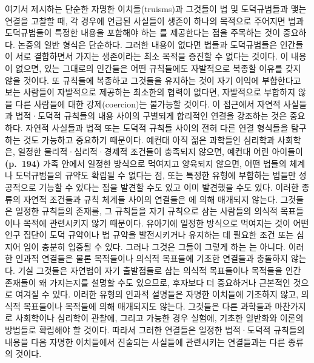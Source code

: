 여기서 제시하는 단순한 자명한 이치들(truisms)과 그것들이 법 및
도덕규범들과 맺는 연결을 고찰할 때, 각 경우에 언급된 사실들이 생존이
하나의 목적으로 주어지면 법과 도덕규범들이 특정한 내용을 포함해야 하는
를 제공한다는 점을 주목하는 것이 중요하다. 논증의
일반 형식은 단순하다. 그러한 내용이 없다면 법들과 도덕규범들은 인간들이
서로 결합하면서 가지는 생존이라는 최소 목적을 증진할 수 없다는 것이다.
이 내용이 없으면, 있는 그대로의 인간들은 어떤 규칙들에도 자발적으로
복종할 이유를 갖지 않을 것이다. 또 규칙들에 복종하고 그것들을 유지하는
것이 자기 이익에 부합한다고 보는 사람들이 자발적으로 제공하는 최소한의
협력이 없다면, 자발적으로 부합하지 않을 다른 사람들에 대한
강제(coercion)는 불가능할 것이다. 이 접근에서 자연적 사실들과
법적·도덕적 규칙들의 내용 사이의 구별되게 합리적인 연결을 강조하는 것은
중요하다. 자연적 사실들과 법적 또는 도덕적 규칙들 사이의 전혀 다른 연결
형식들을 탐구하는 것도 가능하고 중요하기 때문이다. 예컨대 아직 젊은
과학들인 심리학과 사회학은, 일정한 물리적·심리적·경제적 조건들이
충족되지 않으면, 예컨대 어린 아이들이 \textbf{(p.~194)} 가족 안에서
일정한 방식으로 먹여지고 양육되지 않으면, 어떤 법들의 체계나
도덕규범들의 규약도 확립될 수 없다는 점, 또는 특정한 유형에 부합하는
법들만 성공적으로 기능할 수 있다는 점을 발견할 수도 있고 이미 발견했을
수도 있다. 이러한 종류의 자연적 조건들과 규칙 체계들 사이의 연결들은
에 의해 매개되지 않는다. 그것들은 일정한 규칙들의
존재를, 그 규칙들을 자기 규칙으로 삼는 사람들의 의식적 목표들이나 목적에
관련시키지 않기 때문이다. 유아기에 일정한 방식으로 먹여지는 것이 어떤
인구 집단이 도덕 규약이나 법 규약을 발전시키거나 유지하는 데 필요한 조건
또는 심지어 임이 충분히 입증될 수 있다. 그러나 그것은
그들이 그렇게 하는 는 아니다. 이러한 인과적 연결들은 물론
목적들이나 의식적 목표들에 기초한 연결들과 충돌하지 않는다. 기실
그것들은 자연법이 자기 출발점들로 삼는 의식적 목표들이나 목적들을 인간
존재들이 왜 가지는지를 설명할 수도 있으므로, 후자보다 더 중요하거나
근본적인 것으로 여겨질 수 있다. 이러한 유형의 인과적 설명들은 자명한
이치들에 기초하지 않고, 의식적 목표들이나 목적들에 의해 매개되지도
않는다. 그것들은 다른 과학들과 마찬가지로 사회학이나 심리학이 관찰에,
그리고 가능한 경우 실험에, 기초한 일반화와 이론의 방법들로 확립해야 할
것이다. 따라서 그러한 연결들은 일정한 법적·도덕적 규칙들의 내용을 다음
자명한 이치들에서 진술되는 사실들에 관련시키는 연결들과는 다른 종류의
것이다.

